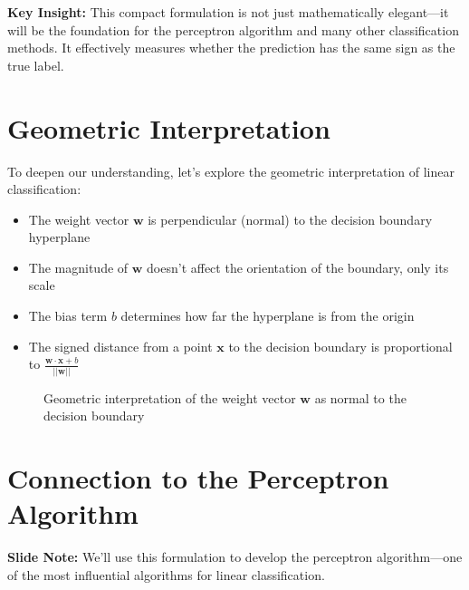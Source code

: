 \documentclass{article}
\newcommand{\slidenote}[1]{\begin{mdframed}[backgroundcolor=blue!10, linewidth=0pt]
\textbf{Slide Note:} #1
\end{mdframed}}
\newcommand{\insight}[1]{\begin{mdframed}[backgroundcolor=yellow!10, linewidth=0pt]
\textbf{Key Insight:} #1
\end{mdframed}}
\begin{document}
\insight{This compact formulation is not just mathematically elegant—it will be the foundation for the perceptron algorithm and many other classification methods. It effectively measures whether the prediction has the same sign as the true label.}

\section{Geometric Interpretation}

To deepen our understanding, let's explore the geometric interpretation of linear classification:

\begin{itemize}
    \item The weight vector $\mathbf{w}$ is perpendicular (normal) to the decision boundary hyperplane
    \item The magnitude of $\mathbf{w}$ doesn't affect the orientation of the boundary, only its scale
    \item The bias term $b$ determines how far the hyperplane is from the origin
    \item The signed distance from a point $\mathbf{x}$ to the decision boundary is proportional to $\frac{\mathbf{w} \cdot \mathbf{x} + b}{||\mathbf{w}||}$
\end{itemize}

\begin{figure}[h]
\centering
{}
\caption{Geometric interpretation of the weight vector $\mathbf{w}$ as normal to the decision boundary}
\end{figure}

\section{Connection to the Perceptron Algorithm}

\slidenote{We'll use this formulation to develop the perceptron algorithm—one of the most influential algorithms for linear classification.}
\end{document}
